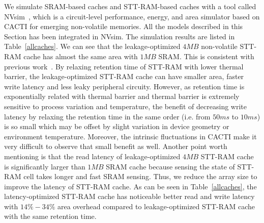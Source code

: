 We simulate SRAM-based caches and STT-RAM-based caches with a tool called NVsim~\cite{CACTI:PCRAMsim}, which is a circuit-level performance, energy, and area simulator based on CACTI for emerging non-volatile memories. All the models described in this Section has been integrated in NVsim. The simulation results are listed in Table~\ref{allcaches}. We can see that the leakage-optimized $4MB$ non-volatile STT-RAM cache has almost the same area with $1MB$ SRAM. This is consistent with previous work~\cite{CACTI:DAC08:Dong}. By relaxing retention time of STT-RAM with lower thermal barrier, the leakage-optimized STT-RAM cache can have smaller area, faster write latency and less leaky peripheral circuity. However, as retention time is exponentially related with thermal barrier and thermal barrier is extremely sensitive to process variation and temperature, the benefit of decreasing write latency by relaxing the retention time in the same order (i.e. from $50ms$ to $10ms$) is so small which may be offset by slight variation in device geometry or environment temperature. Moreover, the intrinsic fluctuations in CACTI make it very difficult to observe that small benefit as well. Another point worth mentioning is that the read latency of leakage-optimized $4MB$ STT-RAM cache is significantly larger than $1MB$ SRAM cache because sensing the state of STT-RAM cell takes longer and fast SRAM sensing. Thus, we reduce the array size to improve the latency of STT-RAM cache. As can be seen in Table~\ref{allcaches}, the latency-optimized STT-RAM cache has noticeable better read and write latency with $14\%-34\%$ area overhead compared to leakage-optimized STT-RAM cache with the same retention time.

